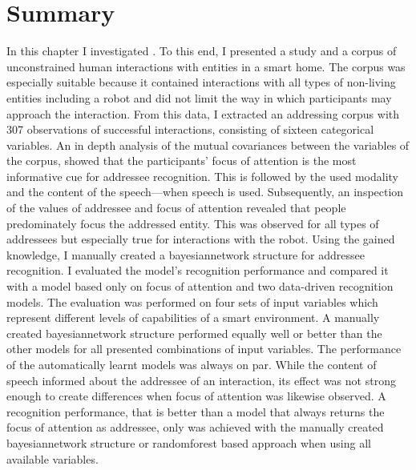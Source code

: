 \section{Summary}

In this chapter I investigated .
To this end, I presented a study and a corpus of unconstrained human interactions with entities in a \gls{smart home}.
The corpus was especially suitable because it contained interactions with all types of non-living entities including a \gls{robot} and did not limit the way in which participants may approach the interaction.
From this data, I extracted an \gls{addressing corpus} with 307 observations of successful interactions, consisting of sixteen categorical variables.
An in depth analysis of the mutual covariances between the variables of the corpus, showed that the participants' focus of attention is the most informative cue for \gls{addressee} recognition.
This is followed by the used modality and the content of the speech---when speech is used.
Subsequently, an inspection of the values of \gls{addressee} and focus of attention revealed that people predominately focus the addressed entity.
This was observed for all types of \glspl{addressee} but especially true for interactions with the \gls{robot}.
Using the gained knowledge, I manually created a \gls{bayesiannetwork} structure for \gls{addressee} recognition.
I evaluated the model's recognition performance and compared it with a model based only on focus of attention and two data-driven recognition models.
The evaluation was performed on four sets of input variables which represent different levels of capabilities of a \gls{smart environment}.
A manually created \gls{bayesiannetwork} structure performed equally well or better than the other models for all presented combinations of input variables.
The performance of the automatically learnt models was always on par.
While the content of speech informed about the \gls{addressee} of an interaction, its effect was not strong enough to create differences when focus of attention was likewise observed.
A recognition performance, that is better than a model that always returns the focus of attention as \gls{addressee}, only was achieved with the manually created \gls{bayesiannetwork} structure or \gls{randomforest} based approach when using all available variables.

